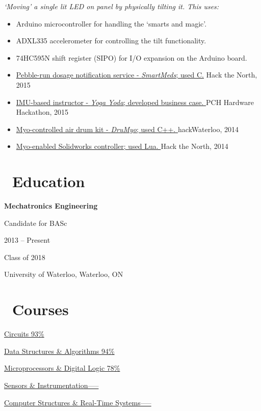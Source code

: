 \documentclass{resume}
\begin{document}
\textit{`Moving' a single lit LED on panel by physically tilting it. This uses:}
\begin{itemize}
  \item Arduino microcontroller for handling the `smarts and magic'.
  \item ADXL335 accelerometer for controlling the tilt functionality. 
  \item 74HC595N shift register (SIPO) for I/O expansion on the Arduino board.
\end{itemize}

\begin{itemize}
  \item \href{https://github.com/DChang87/HtN}{Pebble-run dosage notification service - \textit{SmartMeds}; used C.} \hfill Hack the North, 2015
  \item \href{jkkd.com}{IMU-based instructor - \textit{Yoga Yoda}; developed business case. \hfill} PCH Hardware Hackathon, 2015
  \item \href{http://devpost.com/software/drumyo}{Myo-controlled air drum kit - \textit{DruMyo}; used C++. \hfill} hackWaterloo, 2014
  \item \href{https://github.com/fanwashere/SolidWorksControls}{Myo-enabled Solidworks controller; used Lua. \hfill} Hack the North, 2014
\end{itemize}

\begin{multicols}{2}

\section{\faGraduationCap\ Education}
\textbf{Mechatronics Engineering}\par
Candidate for BASc\par
2013 -- Present\par
Class of 2018\par
University of Waterloo, Waterloo, ON

\columnbreak

\section{\faBook\ Courses}
\href{http://www.ucalendar.uwaterloo.ca/1516/COURSE/course-MTE.html#MTE120}{Circuits \hfill 93\%} \par
\href{http://www.ucalendar.uwaterloo.ca/1516/COURSE/course-MTE.html#MTE262}{Data Structures \& Algorithms \hfill 94\%}\par
\href{http://www.ucalendar.uwaterloo.ca/1516/COURSE/course-MTE.html#MTE262}{Microprocessors \& Digital Logic \hfill 78\%}\par
\href{http://www.ucalendar.uwaterloo.ca/1516/COURSE/course-MTE.html#MTE220}{Sensors \& Instrumentation\hfill -----}\par
\href{http://www.ucalendar.uwaterloo.ca/1516/COURSE/course-MTE.html#MTE241}{Computer Structures \& Real-Time Systems\hfill -----}

\end{multicols}
\end{document}
